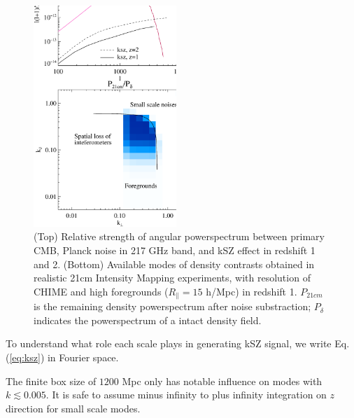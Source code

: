 \documentclass[aps,prd,twocolumn,showpacs,superscriptaddress,groupedaddress,nofootinbib]{revtex4}  %
\begin{document}
\begin{figure}[tbp]
\begin{center}
\includegraphics[width=0.48\textwidth]{figure/cmb_21cm.eps}
\end{center}
\vspace{-0.7cm}
\caption{
    (Top) Relative strength of angular powerspectrum between primary CMB, Planck noise in 217 GHz band, and kSZ effect in redshift 1 and 2.
    (Bottom) Available modes of density contrasts obtained 
    in realistic 21cm Intensity Mapping experiments, 
    with resolution of CHIME and high foregrounds ($R_\parallel=15$ h/Mpc) 
    in redshift 1. 
    $P_{21cm}$ is the remaining density powerspectrum after noise substraction; 
    $P_\delta$ indicates the powerspectrum of a intact density field.
}
\label{fig:cmb_21cm}
\end{figure}

To understand what role each scale plays in generating kSZ signal, we write Eq.(\ref{eq:ksz}) in Fourier space. 

The finite box size of $1200$ Mpc only has notable influence on modes with $k\lesssim0.005$. 
It is safe to assume 
minus infinity to plus infinity 
integration on $z$ direction for small scale modes. 
\end{document}
